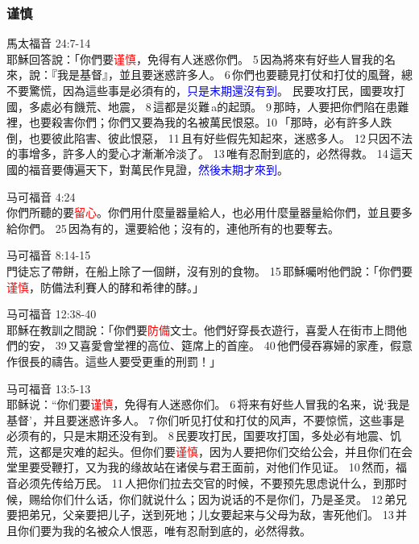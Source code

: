 \subsubsection{谨慎}


馬太福音 24:7-14\\
耶穌回答說：「你們要\textcolor{red}{谨慎}，免得有人迷惑你們。 5 因為將來有好些人冒我的名來，說：『我是基督』，並且要迷惑許多人。 6 你們也要聽見打仗和打仗的風聲，總不要驚慌，因為這些事是必須有的，\textcolor{blue}{只是末期還沒有到}。
民要攻打民，國要攻打國，多處必有饑荒、地震， 8 這都是災難 a的起頭。 9 那時，人要把你們陷在患難裡，也要殺害你們；你們又要為我的名被萬民恨惡。10 「那時，必有許多人跌倒，也要彼此陷害、彼此恨惡， 11 且有好些假先知起來，迷惑多人。 12 只因不法的事增多，許多人的愛心才漸漸冷淡了。 13 唯有忍耐到底的，必然得救。 14 這天國的福音要傳遍天下，對萬民作見證，\textcolor{blue}{然後末期才來到}。

马可福音 4:24\\
你們所聽的要\textcolor{red}{留心}。你們用什麼量器量給人，也必用什麼量器量給你們，並且要多給你們。 25 因為有的，還要給他；沒有的，連他所有的也要奪去。


马可福音 8:14-15\\
門徒忘了帶餅，在船上除了一個餅，沒有別的食物。 15 耶穌囑咐他們說：「你們要\textcolor{red}{谨慎}，防備法利賽人的酵和希律的酵。」

马可福音 12:38-40\\
耶穌在教訓之間說：「你們要\textcolor{red}{防備}文士。他們好穿長衣遊行，喜愛人在街市上問他們的安， 39 又喜愛會堂裡的高位、筵席上的首座。 40 他們侵吞寡婦的家產，假意作很長的禱告。這些人要受更重的刑罰！」





马可福音 13:5-13\\
耶稣说：“你们要\textcolor{red}{谨慎}，免得有人迷惑你们。 6 将来有好些人冒我的名来，说‘我是基督’，并且要迷惑许多人。 7 你们听见打仗和打仗的风声，不要惊慌，这些事是必须有的，只是末期还没有到。 8 民要攻打民，国要攻打国，多处必有地震、饥荒，这都是灾难的起头。但你们要\textcolor{red}{谨慎}，因为人要把你们交给公会，并且你们在会堂里要受鞭打，又为我的缘故站在诸侯与君王面前，对他们作见证。 10 然而，福音必须先传给万民。 11 人把你们拉去交官的时候，不要预先思虑说什么，到那时候，赐给你们什么话，你们就说什么；因为说话的不是你们，乃是圣灵。 12 弟兄要把弟兄，父亲要把儿子，送到死地；儿女要起来与父母为敌，害死他们。 13 并且你们要为我的名被众人恨恶，唯有忍耐到底的，必然得救。

